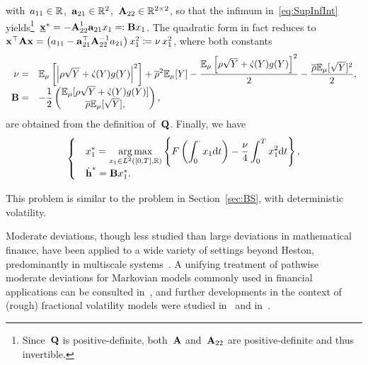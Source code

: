 with~$a_{11} \in\mathbb{R}$,~$\boldsymbol{\mathrm{a}}_{21}\in\mathbb{R}^{2}$,~$\boldsymbol{\mathrm{A}}_{22}\in\mathbb{R}^{2\times 2}$, so that the infimum in~\eqref{eq:SupInfInt} yields\footnote{Since~$\boldsymbol{\mathrm{Q}}$ is positive-definite, both~$\boldsymbol{\mathrm{A}}$ and~$\boldsymbol{\mathrm{A}}_{22}$ are positive-definite and thus invertible.}~${\underline{\boldsymbol{\mathrm{x}}}^{*} = - \boldsymbol{\mathrm{A}}_{22}^{1} \boldsymbol{\mathrm{a}}_{21} x_1 \eqqcolon \boldsymbol{\mathrm{B}} x_1}$. The quadratic form in fact reduces to~${\boldsymbol{\mathrm{x}}^\top \boldsymbol{\mathrm{A}} \boldsymbol{\mathrm{x}} = \left( a_{11} - \boldsymbol{\mathrm{a}}_{21}^\top \boldsymbol{\mathrm{A}}_{22}^{-1} a_{21} \right ) x_1^2 \coloneqq \nu\, x_1^2}$, where both constants
\begin{equation}\label{eq:ConstPDP}
\begin{array}{rl}
\nu = & \displaystyle 
\mathbb{E}_\mu\left[ \left| \rho\sqrt{Y} + \dot{\varsigma}(Y)g(Y)\right|^2 \right ] + \overline{\rho}^2\mathbb{E}_\mu[Y] - \frac{\mathbb{E}_\mu\left[ \rho\sqrt{Y} + \dot{\varsigma}(Y)g(Y)\right]^2}{2} - \frac{\overline{\rho}\mathbb{E}_\mu[\sqrt{Y}]^2}{2},\\
\boldsymbol{\mathrm{B}} = & \displaystyle -\frac{1}{2}\begin{pmatrix}
\mathbb{E}_\mu[\rho\sqrt{Y}+\dot{\varsigma}(Y)g(Y)]\\
\overline{\rho}\mathbb{E}_\mu[\sqrt{Y}],
\end{pmatrix},
\end{array}
\end{equation}
are obtained from the definition of~$\boldsymbol{\mathrm{Q}}$. Finally, we have
\begin{equation}\label{pb-deterministic-large}
\begin{cases}
&\displaystyle x_1^{*}=\operatorname*{arg\,max}\limits_{x_1 \in L^2([0,T],\mathbb{R})}
\left\{F\left(\int_0^\cdot x_1\mathrm{d} t\right) - \frac{\nu}{4}\int_0^T x_1^2 \mathrm{d} t\right\},
\\
&\dot{\boldsymbol{\mathrm{h}}}^{*}
= \boldsymbol{\mathrm{B}} x_1^{*}.
\end{cases}
\end{equation}
\begin{remark}
This problem is similar to the problem in Section~\ref{sec:BS}, with deterministic volatility.
\end{remark}

Moderate deviations, though less studied
than large deviations in mathematical finance,  
have been applied to a wide variety of settings beyond Heston, predominantly in multiscale systems~\cite{Morse2017ModerateDiffusions, Morse2020ImportanceDeviations}. 
A unifying treatment of pathwise moderate deviations for Markovian models commonly used in financial applications
can be consulted in~\cite{Jacquier2019PathwisePricing},
and further developments in the context of (rough) fractional volatility models 
were studied in~\cite{Bayer2018Short-timeModels} 
and in~\cite{Jacquier2022LargeSystems}.


